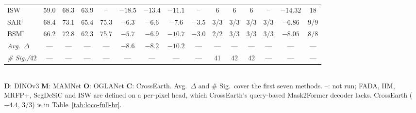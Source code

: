 \begin{table}[t]
\begin{tabular}{l|cccc|cccc|cccc|cc}
ISW       & 59.0 & 68.3 & 63.9 & -- & $-18.5$ & $-13.4$ & $-11.1$ & -- & 6 & 6 & 6 & -- & $-14.32$ & 18 \\
SAR$^\dagger$ & 68.4 & 73.1 & 65.4 & 75.3 & $-6.3$ & $-6.6$ & $-7.6$ & $-3.5$ & 3/3 & 3/3 & 3/3 & 3/3 & $-6.86$ & 9/9 \\
BSM$^\dagger$ & 66.2 & 72.8 & 62.3 & 75.7 & $-5.7$ & $-6.9$ & $-10.7$ & $-3.0$ & 2/2 & 3/3 & 3/3 & 3/3 & $-8.05$ & 8/8 \\
\midrule
\textit{Avg.\ $\Delta$} & --- & --- & --- & --- & $-8.6$ & $-8.2$ & $-10.2$ & --- & --- & --- & --- & --- & --- & --- \\
\textit{\# Sig./$42$} & --- & --- & --- & --- & --- & --- & --- & --- & 41 & 42 & 42 & --- & --- & --- \\
\bottomrule
\end{tabular}
\\[2pt]
\footnotesize
\textbf{D}: DINOv3 \quad \textbf{M}: MAMNet \quad \textbf{O}: OGLANet \quad \textbf{C}: CrossEarth. Avg.\ $\Delta$ and \# Sig.\ cover the first seven methods. --: not run; FADA, IIM, MRFP+, SegDeSiC and ISW are defined on a per-pixel head, which CrossEarth's query-based Mask2Former decoder lacks. CrossEarth \sib{} ($-4.4$, 3/3) is in Table~\ref{tab:loco-full-hr}.
\end{table}